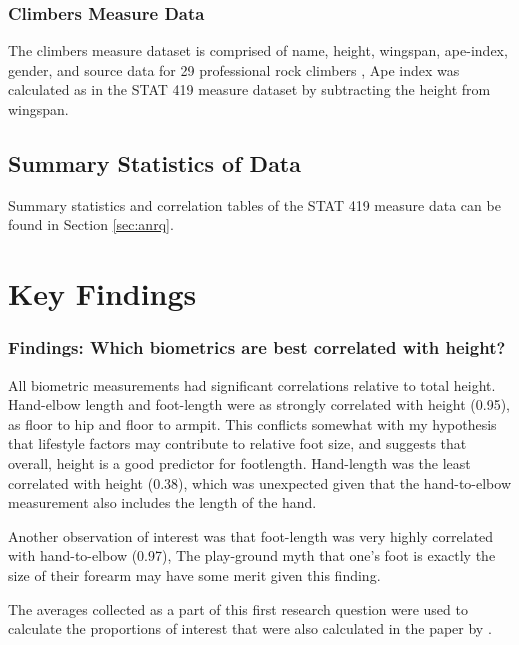 \documentclass[]{article}
\begin{document}
\subsubsection{Climbers Measure Data}
\label{sec:climbdat}

The climbers measure dataset is comprised of name, height, wingspan,
ape-index, gender, and source data for 29 professional rock climbers
\citep{99Boulders, youtube, Sportiva, GymClimber2019a}, Ape index was
calculated as in the STAT 419 measure dataset by subtracting the height
from wingspan.

\subsection{Summary Statistics of Data}
\label{sec:data-summary}

Summary statistics and correlation tables of the STAT 419 measure data
can be found in Section \ref{sec:anrq}.

\section{Key Findings}
\label{sec:findings}

\subsubsection{Findings: Which biometrics are best correlated with height?}
\label{sec:findRQ}

All biometric measurements had significant correlations relative to
total height. Hand-elbow length and foot-length were as strongly
correlated with height (0.95), as floor to hip and floor to armpit. This
conflicts somewhat with my hypothesis that lifestyle factors may
contribute to relative foot size, and suggests that overall, height is a
good predictor for footlength. Hand-length was the least correlated with
height (0.38), which was unexpected given that the hand-to-elbow
measurement also includes the length of the hand.

Another observation of interest was that foot-length was very highly
correlated with hand-to-elbow (0.97), The play-ground myth that one's
foot is exactly the size of their forearm may have some merit given this
finding.

The averages collected as a part of this first research question were
used to calculate the proportions of interest that were also calculated
in the paper by \citet{Thomas:2020}.
\end{document}

